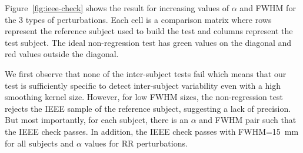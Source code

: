 \documentclass{article}
\begin{document}
Figure~\ref{fig:ieee-check} shows the result for increasing values of $\alpha$ and FWHM for the 3 types of perturbations. Each cell is a comparison matrix where rows represent the reference subject used to build the test and columns represent the test subject. The ideal non-regression test has green values on the diagonal and red values outside the diagonal.

We first observe that none of the inter-subject tests fail which means that our test is sufficiently specific to detect inter-subject variability even with a high smoothing kernel size. However, for low FWHM sizes, the non-regression test rejects the IEEE sample of the reference subject, suggesting a lack of precision. But most importantly, for each subject, there is an $\alpha$ and FWHM pair such that the IEEE check passes. In addition, the IEEE check passes with FWHM=15~mm for all subjects and $\alpha$ values for RR perturbations.
\end{document}
